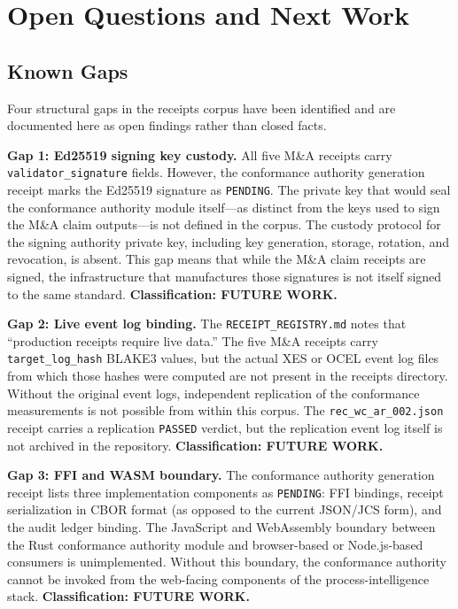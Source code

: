 \section{Open Questions and Next Work}
\label{sec:receipts-questions}

\subsection{Known Gaps}
\label{sec:receipts-questions-gaps}

Four structural gaps in the receipts corpus have been identified and are documented
here as open findings rather than closed facts.

\textbf{Gap 1: Ed25519 signing key custody.} All five M\&A receipts carry
\texttt{validator\_signature} fields. However, the conformance authority generation
receipt marks the Ed25519 signature as \texttt{PENDING}. The private key that would
seal the conformance authority module itself---as distinct from the keys used to sign
the M\&A claim outputs---is not defined in the corpus. The custody protocol for the
signing authority private key, including key generation, storage, rotation, and
revocation, is absent. This gap means that while the M\&A claim receipts are signed,
the infrastructure that manufactures those signatures is not itself signed to the same
standard. \textbf{Classification: FUTURE WORK.}

\textbf{Gap 2: Live event log binding.} The \texttt{RECEIPT\_REGISTRY.md} notes that
``production receipts require live data.'' The five M\&A receipts carry
\texttt{target\_log\_hash} BLAKE3 values, but the actual XES or OCEL event log files
from which those hashes were computed are not present in the receipts directory. Without
the original event logs, independent replication of the conformance measurements is not
possible from within this corpus. The \texttt{rec\_wc\_ar\_002.json} receipt carries a
replication \texttt{PASSED} verdict, but the replication event log itself is not archived
in the repository. \textbf{Classification: FUTURE WORK.}

\textbf{Gap 3: FFI and WASM boundary.} The conformance authority generation receipt
lists three implementation components as \texttt{PENDING}: FFI bindings, receipt
serialization in CBOR format (as opposed to the current JSON/JCS form), and the audit
ledger binding. The JavaScript and WebAssembly boundary between the Rust conformance
authority module and browser-based or Node.js-based consumers is unimplemented.
Without this boundary, the conformance authority cannot be invoked from the web-facing
components of the process-intelligence stack. \textbf{Classification: FUTURE WORK.}

